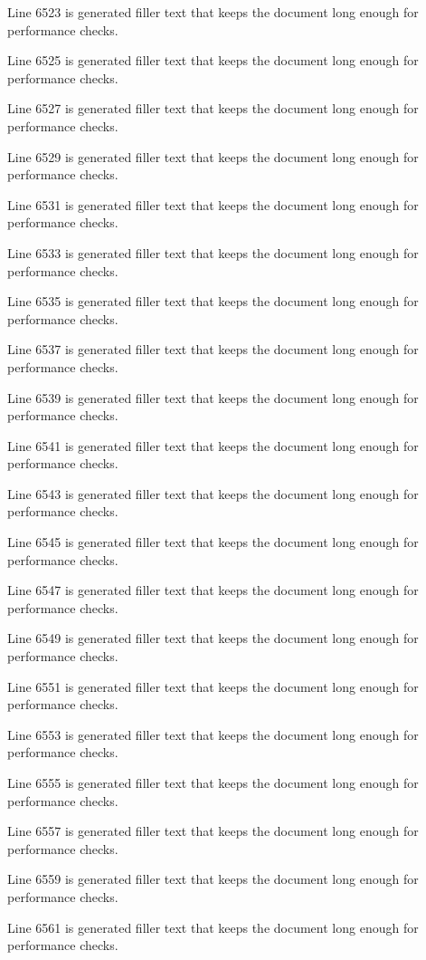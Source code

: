 Line 6523 is generated filler text that keeps the document long enough for performance checks.

Line 6525 is generated filler text that keeps the document long enough for performance checks.

Line 6527 is generated filler text that keeps the document long enough for performance checks.

Line 6529 is generated filler text that keeps the document long enough for performance checks.

Line 6531 is generated filler text that keeps the document long enough for performance checks.

Line 6533 is generated filler text that keeps the document long enough for performance checks.

Line 6535 is generated filler text that keeps the document long enough for performance checks.

Line 6537 is generated filler text that keeps the document long enough for performance checks.

Line 6539 is generated filler text that keeps the document long enough for performance checks.

Line 6541 is generated filler text that keeps the document long enough for performance checks.

Line 6543 is generated filler text that keeps the document long enough for performance checks.

Line 6545 is generated filler text that keeps the document long enough for performance checks.

Line 6547 is generated filler text that keeps the document long enough for performance checks.

Line 6549 is generated filler text that keeps the document long enough for performance checks.

Line 6551 is generated filler text that keeps the document long enough for performance checks.

Line 6553 is generated filler text that keeps the document long enough for performance checks.

Line 6555 is generated filler text that keeps the document long enough for performance checks.

Line 6557 is generated filler text that keeps the document long enough for performance checks.

Line 6559 is generated filler text that keeps the document long enough for performance checks.

Line 6561 is generated filler text that keeps the document long enough for performance checks.

